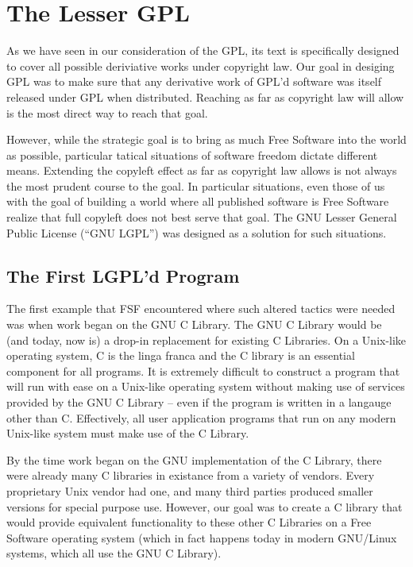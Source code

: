 \documentclass[12pt]{report}
\begin{document}
\chapter{The Lesser GPL}

As we have seen in our consideration of the GPL, its text is specifically
designed to cover all possible deriviative works under copyright law.  Our
goal in desiging GPL was to make sure that any derivative work of GPL'd
software was itself released under GPL when distributed.  Reaching as far
as copyright law will allow is the most direct way to reach that goal.

However, while the strategic goal is to bring as much Free Software into
the world as possible, particular tatical situations of software freedom
dictate different means.  Extending the copyleft effect as far as
copyright law allows is not always the most prudent course to the goal.
In particular situations, even those of us with the goal of building a
world where all published software is Free Software realize that full
copyleft does not best serve that goal.  The GNU Lesser General Public
License (``GNU LGPL'') was designed as a solution for such situations.

\section{The First LGPL'd Program}

The first example that FSF encountered where such altered tactics were
needed was when work began on the GNU C Library.  The GNU C Library would
be (and today, now is) a drop-in replacement for existing C Libraries.  On
a Unix-like operating system, C is the linga franca and the C library is
an essential component for all programs.  It is extremely difficult to
construct a program that will run with ease on a Unix-like operating
system without making use of services provided by the GNU C Library --
even if the program is written in a langauge other than C\@.  Effectively,
all user application programs that run on any modern Unix-like system must
make use of the C Library.

By the time work began on the GNU implementation of the C Library, there
were already many C libraries in existance from a variety of vendors.
Every proprietary Unix vendor had one, and many third parties produced
smaller versions for special purpose use.  However, our goal was to create
a C library that would provide equivalent functionality to these other C
Libraries on a Free Software operating system (which in fact happens today
in modern GNU/Linux systems, which all use the GNU C Library).
\end{document}
